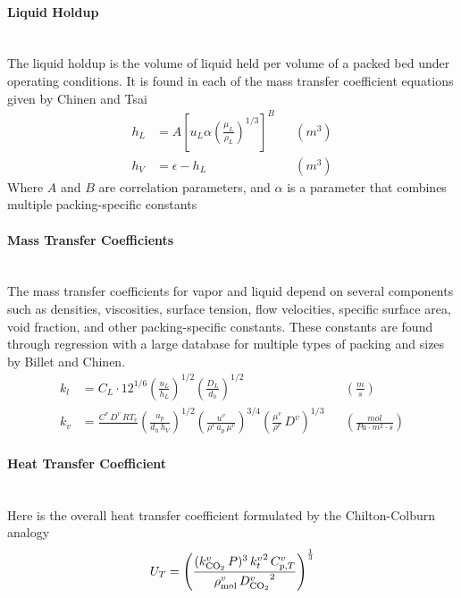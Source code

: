 \documentclass[a4paper,fleqn]{cas-sc}
\newcommand{\COtwo}{{\ce{CO2}}}
\newcommand{\vap}{v}
\begin{document}
    \paragraph{Liquid Holdup}\mbox{}\\[0.5em]
    The liquid holdup is the volume of liquid held per volume of a packed bed under operating conditions. It is found in each of the mass transfer coefficient equations given by Chinen and Tsai~\cite{Chinen2018,Tsai2010}
    \begin{align}
        h_L &= A\left[u_L \alpha\left(\frac{\mu_L}{\rho_L}\right)^{1 / 3}\right]^{B} && \left(\unit{m}^3 \right)\\
        h_V &= \epsilon - h_L && \left(\unit{m}^3 \right)
    \end{align}
    Where $A$ and $B$ are correlation parameters, and $\alpha$ is a parameter that combines multiple packing-specific constants

    \paragraph{Mass Transfer Coefficients}\mbox{}\\[0.5em]
    The mass transfer coefficients for vapor and liquid depend on several components such as densities, viscosities, surface tension, flow velocities, specific surface area, void fraction, and other packing-specific constants. These constants are found through regression with a large database for multiple types of packing and sizes by Billet and Chinen\cite{Billet1999, Chinen2018}.
    \begin{align}
        k_l &= C_L \cdot 12^{1 / 6}\left(\frac{u_L}{h_L}\right)^{1 / 2}\left(\frac{D_L}{d_h}\right)^{1 / 2} && \left(\frac{\unit{m} }{\unit{s}} \right)\\
        k_v &= \frac{C^{\vap}\,D^{\vap}\,RT_v}{}
        \left(\frac{a_p}{d_h\,h_V}\right)^{1/2}
        \left(\frac{u^{\vap}}{\rho^{\vap}\,a_p\,\mu^{\vap}}\right)^{3 / 4}
        \left(\frac{\mu^{\vap}}{\rho^{\vap}}\,D^{\vap}\right)^{1 / 3}
        && \left(\frac{\unit{mol} }{\unit{Pa} \cdot{m}^2 \cdot \unit{s}} \right)
    \end{align}

    \paragraph{Heat Transfer Coefficient}\mbox{}\\[0.5em]
    Here is the overall heat transfer coefficient formulated by the Chilton-Colburn analogy
    \begin{align}
        U_T = \left(\frac{(k^{\vap}_{\COtwo}\,P)^3\,{k_{t}^{\vap}}^{2}\,C^{\vap}_{p,T}}{\rho^{\vap}_{\text{mol}}\,{D^{\vap}_{\COtwo}}^2}\right)^{\frac{1}{3}}
    \end{align}
\end{document}
